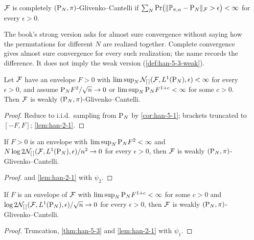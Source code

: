 \begin{definition}
  \label{def:han-5-3-strong}
  $\mathcal{F}$ is completely $(\mathrm{P}_N,\pi)$-Glivenko--Cantelli if $\sum_N\Pr\bigl(\|\mathbb{P}_{\pi,n}-\mathrm{P}_N\|_{\mathcal{F}}>\epsilon\bigr)<\infty$ for every $\epsilon>0$.
\end{definition}
\begin{remark}
  The book's strong version asks for almost sure convergence without saying how the permutations for different $N$ are realized together. Complete convergence gives almost sure convergence for every such realization; the name records the difference. It does not imply the weak version (\cref{def:han-5-3-weak}).
\end{remark}

\begin{theorem}
  \label{thm:han-5-7}
  Let $\mathcal{F}$ have an envelope $F>0$ with $\limsup_N\mathcal{N}_{[\,]}(\mathcal{F},L^1(\mathrm{P}_N),\epsilon)<\infty$ for every $\epsilon>0$, and assume $\mathrm{P}_N F^2/\sqrt n\to0$ or $\limsup_N\mathrm{P}_N F^{1+c}<\infty$ for some $c>0$. Then $\mathcal{F}$ is weakly $(\mathrm{P}_N,\pi)$-Glivenko--Cantelli.
\end{theorem}
\begin{proof}
  Reduce to i.i.d.\ sampling from $\mathrm{P}_N$ by \cref{cor:han-5-1}; brackets truncated to $[-F,F]$; \cref{lem:han-2-1}.
\end{proof}

\begin{theorem}
  \label{thm:han-5-8}
  If $F>0$ is an envelope with $\limsup_N\mathrm{P}_N F^2<\infty$ and $N\log2\mathcal{N}_{[\,]}(\mathcal{F},L^1(\mathrm{P}_N),\epsilon)/n^2\to0$ for every $\epsilon>0$, then $\mathcal{F}$ is weakly $(\mathrm{P}_N,\pi)$-Glivenko--Cantelli.
\end{theorem}
\begin{proof}
   and \cref{lem:han-2-1} with $\psi_2$.
\end{proof}

\begin{theorem}
  \label{thm:han-5-9}
  If $F$ is an envelope of $\mathcal{F}$ with $\limsup_N\mathrm{P}_N F^{1+c}<\infty$ for some $c>0$ and $\log2\mathcal{N}_{[\,]}(\mathcal{F},L^1(\mathrm{P}_N),\epsilon)/\sqrt n\to0$ for every $\epsilon>0$, then $\mathcal{F}$ is weakly $(\mathrm{P}_N,\pi)$-Glivenko--Cantelli.
\end{theorem}
\begin{proof}
  Truncation, \cref{thm:han-5-3} and \cref{lem:han-2-1} with $\psi_1$.
\end{proof}

